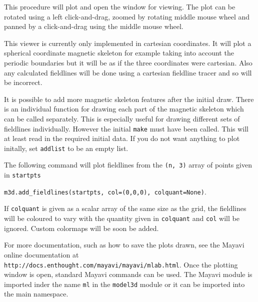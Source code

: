 \documentclass[12pt]{article}
\begin{document}
      This procedure will plot and open the window for viewing. The plot can be rotated using a left click-and-drag, zoomed by rotating middle mouse wheel and panned by a click-and-drag using the middle mouse wheel.

      This viewer is currently only implemented in cartesian coordinates. It will plot a spherical coordinate magnetic skeleton for example taking into account the periodic boundaries but it will be as if the three coordinates were cartesian. Also any calculated fieldlines will be done using a cartesian fieldline tracer and so will be incorrect.

      It is possible to add more magnetic skeleton features after the initial draw. There is an individual function for drawing each part of the magnetic skeleton which can be called separately. This is especially useful for drawing different sets of fieldlines individually. However the initial \texttt{make} must have been called. This will at least read in the required initial data. If you do not want anything to plot initally, set \texttt{addlist} to be an empty list.

      The following command will plot fieldlines from the \texttt{(n, 3)} array of points given in \texttt{startpts}
      
      \texttt{m3d.add\_fieldlines(startpts, col=(0,0,0), colquant=None)}.

      If \texttt{colquant} is given as a scalar array of the same size as the grid, the fieldlines will be coloured to vary with the quantity given in \texttt{colquant} and \texttt{col} will be ignored. Custom colormaps will be soon be added.

      For more documentation, such as how to save the plots drawn, see the Mayavi online documentation at \texttt{http://docs.enthought.com/mayavi/mayavi/mlab.html}. Once the plotting window is open, standard Mayavi commands can be used. The Mayavi module is imported inder the name \texttt{ml} in the \texttt{model3d} module or it can be imported into the main namespace.

      \begin{center}
      \end{center}

  \printbibliography
\end{document}
